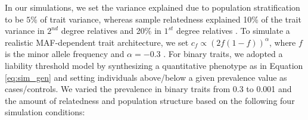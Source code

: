 In our simulations, we set the variance explained due to population stratification to be $5\%$ of trait variance, whereas sample relatedness explained 10\% of the trait variance in $2^{nd}$ degree relatives and 20\% in $1^{st}$ degree relatives \cite{jiang2019resource}.
%
To simulate a realistic MAF-dependent trait architecture, we set $c_f \propto (2f(1-f))^{\alpha}$, where $f$ is the minor allele frequency and $\alpha = -0.3$ \cite{zeng2018signatures,schoech2019quantification}.
%
For binary traits, we adopted a liability threshold model by synthesizing a quantitative phenotype as in Equation \ref{eq:sim_gen} and setting individuals above/below a given prevalence value as cases/controls.
%
We varied the prevalence in binary traits from 0.3 to 0.001 and the amount of relatedness and population structure based on the following four simulation conditions:
